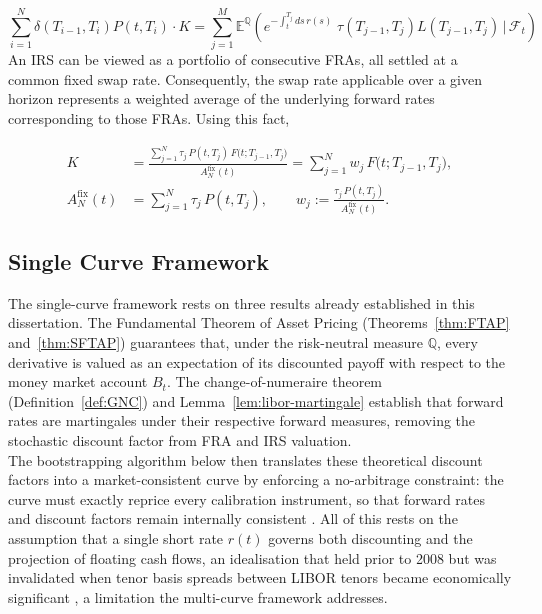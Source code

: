     \begin{equation}\label{eq:swp_linear_fras} 
        \sum_{i=1}^{N} \delta(T_{i-1}, T_i) P(t, T_i) \cdot K = 
        \sum_{j=1}^{M} \mathbb{E}^{\mathbb{Q}} \left( e^{-\int_t^{T_j} ds \, r(s)} \; \tau(T_{j-1}, T_j) L(T_{j-1}, T_j) \,\Big|\, \mathcal{F}_t \right)
    \end{equation}
    \noindent
    An IRS can be viewed as a portfolio of consecutive FRAs, all settled at a common fixed swap rate. Consequently, the swap rate applicable over a given horizon represents a weighted average of the underlying forward rates corresponding to those FRAs. Using this fact, 
    
    \begin{align}
      K
      &= \frac{\sum_{j=1}^{N} \tau_j \, P(t,T_j)\, F\big(t; T_{j-1}, T_j\big)}
              {A^{\text{fix}}_N(t)}
       = \sum_{j=1}^{N} w_j \, F\big(t; T_{j-1}, T_j\big),
      \\
      A^{\text{fix}}_N(t)
      &= \sum_{j=1}^{N} \tau_j \, P(t,T_j),
      \qquad
      w_j := \frac{\tau_j \, P(t,T_j)}{A^{\text{fix}}_N(t)} .
    \end{align}
    
    \subsection*{Single Curve Framework}

    \noindent
    The single-curve framework rests on three results already established in this dissertation. The Fundamental Theorem of Asset Pricing (Theorems~\ref{thm:FTAP} and~\ref{thm:SFTAP}) guarantees that, under the risk-neutral measure $\mathbb{Q}$, every derivative is valued as an expectation of its discounted payoff with respect to the money market account $B_t$. The change-of-numeraire theorem (Definition~\ref{def:GNC}) and Lemma~\ref{lem:libor-martingale} establish that forward rates are martingales under their respective forward measures, removing the stochastic discount factor from FRA and IRS valuation. \\

   \noindent 
   The bootstrapping algorithm below then translates these theoretical discount factors into a market-consistent curve by enforcing a no-arbitrage constraint: the curve must exactly reprice every calibration instrument, so that forward rates and discount factors remain internally consistent \cite{brigo2001interest}. All of this rests on the assumption that a single short rate $r(t)$ governs both discounting and the projection of floating cash flows, an idealisation that held prior to 2008 but was invalidated when tenor basis spreads between LIBOR tenors became economically significant \cite{bianchetti2008two}, a limitation the multi-curve framework addresses.
    
